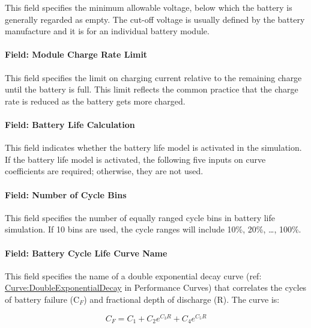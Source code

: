 This field specifies the minimum allowable voltage, below which the battery is generally regarded as empty. The cut-off voltage is usually defined by the battery manufacture and it is for an individual battery module.

\paragraph{Field: Module Charge Rate Limit}\label{field-module-charge-rate-limit}

This field specifies the limit on charging current relative to the remaining charge until the battery is full. This limit reflects the common practice that the charge rate is reduced as the battery gets more charged.

\paragraph{Field: Battery Life Calculation}\label{field-battery-life-calculation}

This field indicates whether the battery life model is activated in the simulation. If the battery life model is activated, the following five inputs on curve coefficients are required; otherwise, they are not used.

\paragraph{Field: Number of Cycle Bins}\label{field-number-of-cycle-bins}

This field specifies the number of equally ranged cycle bins in battery life simulation. If 10 bins are used, the cycle ranges will include 10\%, 20\%, \ldots{}, 100\%.

\paragraph{Field: Battery Cycle Life Curve Name}\label{field-battery-cycle-life-curve-name}

This field specifies the name of a double exponential decay curve (ref: \hyperref[curvedoubleexponentialdecay]{Curve:DoubleExponentialDecay} in Performance Curves) that correlates the cycles of battery failure (C\(_{F}\)) and fractional depth of discharge (R). The curve is:

\begin{equation}
{C_F} = {C_1} + {C_2}{e^{{C_3}R}} + {C_4}{e^{{C_5}R}}
\end{equation}

